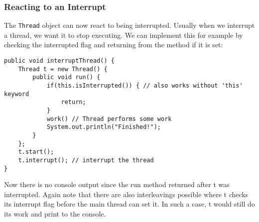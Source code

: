 \documentclass[main.tex]{subfiles}
\begin{document}
\subsubsection{Reacting to an Interrupt}
The \texttt{Thread} object can now react to being interrupted. Usually when we interrupt a thread, we want it to stop executing. We can implement this for example by checking the interrupted flag and returning from the method if it is set:
\begin{verbatim}
public void interruptThread() {
    Thread t = new Thread() {
        public void run() {
            if(this.isInterrupted()) { // also works without 'this' keyword
                return;
            }
            work() // Thread performs some work
            System.out.println("Finished!");
        }
    };
    t.start();
    t.interrupt(); // interrupt the thread
}
\end{verbatim}
Now there is no console output since the run method returned after t was interrupted. Again note that there are also interleavings possible where t checks its interrupt flag before the main thread can set it. In such a case, t would still do its work and print to the console.
\end{document}
